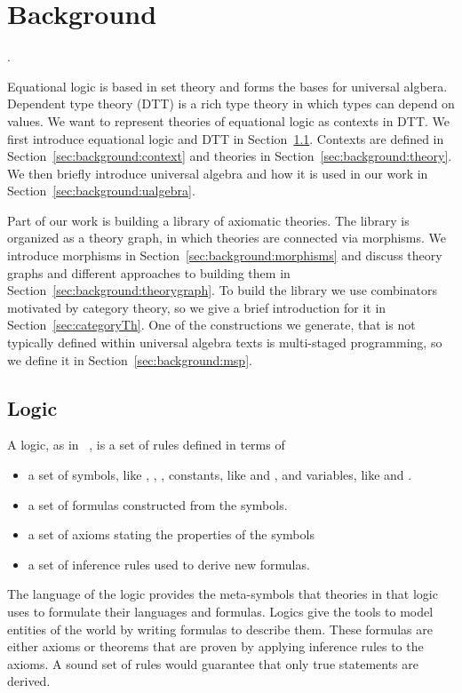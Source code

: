 \chapter{Background}
. 

Equational logic is based in set theory and forms the bases for universal algbera.  Dependent type theory (DTT) is a rich type theory in which types can depend on values. We want to represent theories of equational logic as contexts in DTT. We first introduce equational logic and DTT in Section~\ref{sec:background:logic}. 
Contexts are defined in Section~\ref{sec:background:context} and theories in Section~\ref{sec:background:theory}. We then briefly introduce universal algebra and how it is used in our work in Section~\ref{sec:background:ualgebra}. 

Part of our work is building a library of axiomatic theories. The library is organized as a theory graph, in which theories are connected via morphisms. We introduce morphisms in Section~\ref{sec:background:morphisms} and discuss theory graphs and different approaches to building them in Section~\ref{sec:background:theorygraph}. 
To build the library we use combinators motivated by category theory, so we give a brief introduction for it in Section~\ref{sec:categoryTh}. 
One of the constructions we generate, that is not typically defined within universal algebra texts is multi-staged programming, so we define it in Section~\ref{sec:background:msp}. 

\section{Logic}
\label{sec:background:logic}
A logic, as in ~\cite{Gries1993FormalLogic}, is a set of rules defined in terms of 
\begin{itemize}
\item a set of symbols, like \lstmath{=}, \lstmath{$\wedge$}, \lstmath{$\vee$}, constants, like  and , and variables, like  and . 
\item a set of formulas constructed from the symbols.  
\item a set of axioms stating the properties of the symbols  
\item a set of inference rules used to derive new formulas.  
\end{itemize}
The language of the logic provides the meta-symbols that theories in that logic uses to formulate their languages and formulas. Logics give the tools to model entities of the world by writing formulas to describe them. These formulas are either axioms or theorems that are proven by applying inference rules to the axioms. A sound set of rules would guarantee that only true statements are derived. 

